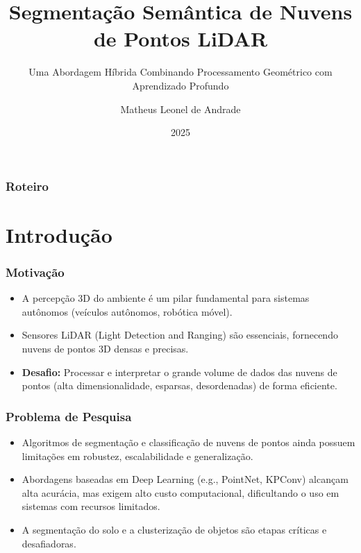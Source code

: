 \documentclass[aspectratio=169,t,xcolor=table]{beamer}
\begin{document}
\title[Inf UFG]{Segmentação Semântica de Nuvens de Pontos LiDAR}
\subtitle{Uma Abordagem Híbrida Combinando Processamento Geométrico
com Aprendizado Profundo}

\author{Matheus Leonel de Andrade}

\date{2025}
\frame[noframenumbering]{\titlepage}



\begin{frame}
    \frametitle{Roteiro}
    \tableofcontents
\end{frame}


\section{Introdução}

\begin{frame}
    \frametitle{Motivação}
    \begin{itemize}
        \item A percepção 3D do ambiente é um pilar fundamental para sistemas autônomos (veículos autônomos, robótica móvel).
        \item Sensores LiDAR (Light Detection and Ranging) são essenciais, fornecendo nuvens de pontos 3D densas e precisas.
        \item \textbf{Desafio:} Processar e interpretar o grande volume de dados das nuvens de pontos (alta dimensionalidade, esparsas, desordenadas) de forma eficiente.
    \end{itemize}
\end{frame}

\begin{frame}
    \frametitle{Problema de Pesquisa}
    \begin{itemize}
        \item Algoritmos de segmentação e classificação de nuvens de pontos ainda possuem limitações em robustez, escalabilidade e generalização.
        \item Abordagens baseadas em Deep Learning (e.g., PointNet, KPConv) alcançam alta acurácia, mas exigem alto custo computacional, dificultando o uso em sistemas com recursos limitados.
        \item A segmentação do solo e a clusterização de objetos são etapas críticas e desafiadoras.
    \end{itemize}
\end{frame}
\end{document}
